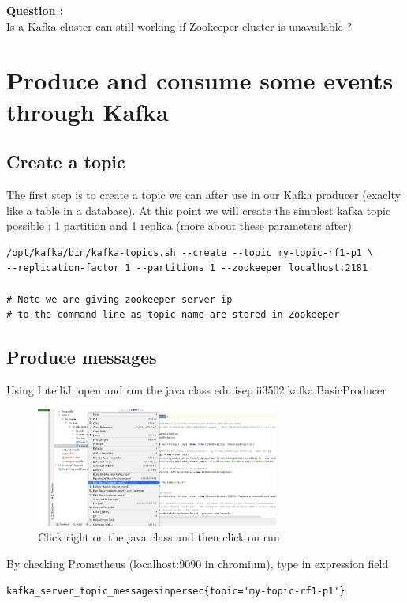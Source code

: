 \documentclass{article}
\newcounter{question}
\newenvironment{question}
    { \begin{mdframed}[backgroundcolor=gray!20] \textbf{Question \arabic{question} : } \stepcounter{question} \\}
    {  \end{mdframed}}
\newenvironment{code}
    { \begin{mdframed} }    {  \end{mdframed}}
\begin{document}
\begin{question}
  Is a Kafka cluster can still working if Zookeeper cluster is unavailable ?  
\end{question}


\section{Produce and consume some events through Kafka}
\subsection{Create a topic}
The first step is to create a topic we can after use in our Kafka producer (exaclty like a table in a database). At this point we will create the simplest kafka topic possible : 1 partition and 1 replica (more about these parameters after)

\begin{code}
    \begin{verbatim}
/opt/kafka/bin/kafka-topics.sh --create --topic my-topic-rf1-p1 \
--replication-factor 1 --partitions 1 --zookeeper localhost:2181

# Note we are giving zookeeper server ip
# to the command line as topic name are stored in Zookeeper
    \end{verbatim}
\end{code}
\subsection{Produce messages}
Using IntelliJ, open and run the java class edu.isep.ii3502.kafka.BasicProducer

\begin{figure}[H]
\includegraphics[width=8cm]{runJava.png}
\caption{Click right on the java class and then click on run}
\centering
\end{figure}





By checking Prometheus (localhost:9090 in chromium), type in expression field
  \begin{verbatim}
kafka_server_topic_messagesinpersec{topic='my-topic-rf1-p1'}
    \end{verbatim}
\end{document}
